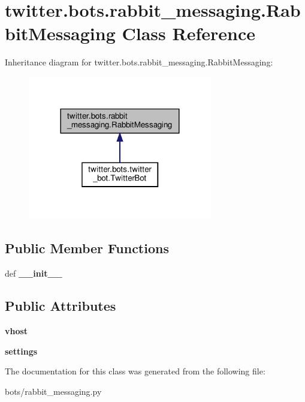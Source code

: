 \hypertarget{classtwitter_1_1bots_1_1rabbit__messaging_1_1RabbitMessaging}{}\section{twitter.\+bots.\+rabbit\+\_\+messaging.\+Rabbit\+Messaging Class Reference}
\label{classtwitter_1_1bots_1_1rabbit__messaging_1_1RabbitMessaging}


Inheritance diagram for twitter.\+bots.\+rabbit\+\_\+messaging.\+Rabbit\+Messaging\+:
\nopagebreak
\begin{figure}[H]
\begin{center}
\leavevmode
\includegraphics[width=228pt]{classtwitter_1_1bots_1_1rabbit__messaging_1_1RabbitMessaging__inherit__graph}
\end{center}
\end{figure}
\subsection*{Public Member Functions}
\begin{DoxyCompactItemize}
\item 
\mbox{\label{classtwitter_1_1bots_1_1rabbit__messaging_1_1RabbitMessaging_a34c66d4ac88da28a2bd316ff79edf262}} 
def {\bfseries \+\_\+\+\_\+init\+\_\+\+\_\+}
\end{DoxyCompactItemize}
\subsection*{Public Attributes}
\begin{DoxyCompactItemize}
\item 
\mbox{\label{classtwitter_1_1bots_1_1rabbit__messaging_1_1RabbitMessaging_a191a98366932a439235d21008d942267}} 
{\bfseries vhost}
\item 
\mbox{\label{classtwitter_1_1bots_1_1rabbit__messaging_1_1RabbitMessaging_a6b30781862012f4ca02c57b581e4561f}} 
{\bfseries settings}
\end{DoxyCompactItemize}


The documentation for this class was generated from the following file\+:\begin{DoxyCompactItemize}
\item 
bots/rabbit\+\_\+messaging.\+py\end{DoxyCompactItemize}
